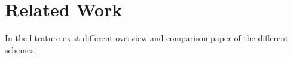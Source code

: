  \chapter{Related Work}

In the litrature exist different overview and comparison paper of the different schemes. 





